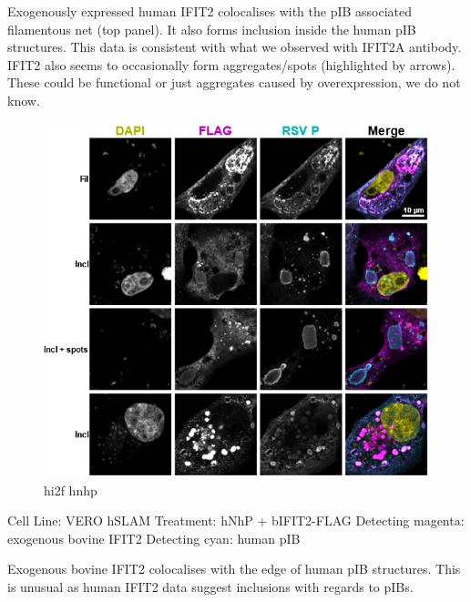 Exogenously expressed human IFIT2 colocalises with the pIB associated filamentous net (top panel). It also forms inclusion inside the human pIB structures. This data is consistent with what we observed with IFIT2A antibody. IFIT2 also seems to occasionally form aggregates/spots (highlighted by arrows). These could be functional or just aggregates caused by overexpression, we do not know.

\begin{figure}
    \centering
    \includegraphics[width=1\linewidth]{10. Chapter 5//Figs//03. IFIT2-FLAG/02. hi2f hnhp.png}
    \caption[hi2f hnhp]{hi2f hnhp}
    \label{hi2f hnhp}
\end{figure}

Cell Line: VERO hSLAM \newline
Treatment: hNhP + bIFIT2-FLAG \newline
Detecting magenta: exogenous bovine IFIT2 \newline
Detecting cyan: human pIB \newline

Exogenous bovine IFIT2 colocalises with the edge of human pIB structures. This is unusual as human IFIT2 data suggest inclusions with regards to pIBs.

